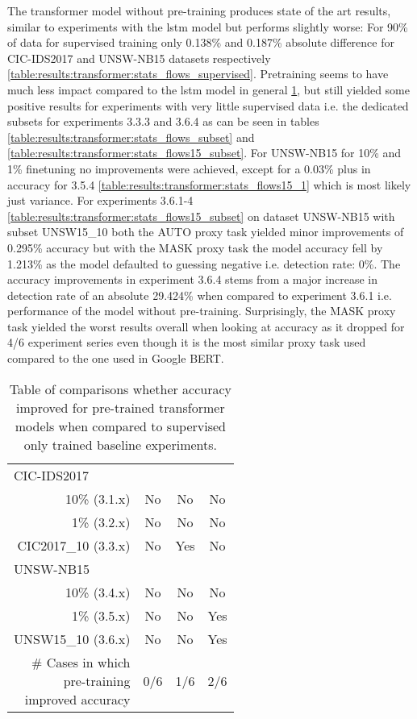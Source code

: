 The transformer model without pre-training produces state of the art results, similar to experiments with the \gls{lstm} model but  performs slightly worse: For 90\% of data for supervised training only 0.138\% and 0.187\% absolute difference for CIC-IDS2017 and UNSW-NB15 datasets respectively \ref{table:results:transformer:stats_flows_supervised}.
Pretraining seems to have much less impact compared to the \gls{lstm} model in general \ref{table:results:transformer:improvement_results}, but still yielded some positive results for experiments with very little supervised data i.e. the dedicated subsets for experiments 3.3.3 and 3.6.4 as can be seen in tables \ref{table:results:transformer:stats_flows_subset} and \ref{table:results:transformer:stats_flows15_subset}. 
For UNSW-NB15 for 10\% and 1\% finetuning no improvements were achieved, except for a 0.03\% plus in accuracy for 3.5.4 \ref{table:results:transformer:stats_flows15_1} which is most likely just variance.
For experiments 3.6.1-4 \ref{table:results:transformer:stats_flows15_subset} on dataset UNSW-NB15 with subset UNSW15\_10 both the AUTO proxy task yielded minor improvements of 0.295\% accuracy but with the MASK proxy task the model accuracy fell by 1.213\% as the model defaulted to guessing negative i.e. detection rate: 0\%. The accuracy improvements in experiment 3.6.4 stems from a major increase in detection rate of an absolute 29.424\% when compared to experiment 3.6.1 i.e. performance of the model without pre-training.
Surprisingly, the MASK proxy task yielded the worst results overall when looking at accuracy as it dropped for 4/6 experiment series even though it is the most similar proxy task used compared to the one used in Google BERT.

\begin{table}[!htbp]
	\centering
	\begin{tabular}{rccc}
		\thead{\textbf{Experiments (\#)}} & \thead{\textbf{MASK(2)}} & \thead{\textbf{OBSCURE(3)}} & \thead{\textbf{AUTO(4)}} \\ \midrule
		\multicolumn{4}{l}{CIC-IDS2017} \\ \midrule
		10\% (3.1.x)   & No  & No   & No   \\
		1\% (3.2.x)    & No  & No   & No   \\
		CIC2017\_10 (3.3.x) & No  & Yes  & No   \\ \midrule
		\multicolumn{4}{l}{UNSW-NB15} \\ \midrule
		10\% (3.4.x)     & No  & No   & No   \\
		1\% (3.5.x)      & No  & No   & Yes  \\
		UNSW15\_10 (3.6.x)   & No  & No   & Yes  \\ \midrule
		\makecell{\# Cases in which \\ pre-training \\ improved accuracy} & 0/6 & 1/6 & 2/6
	\end{tabular}
	\caption{Table of comparisons whether accuracy improved for pre-trained transformer models when compared to supervised only trained baseline experiments.}
	\label{table:results:transformer:improvement_results}
\end{table}

